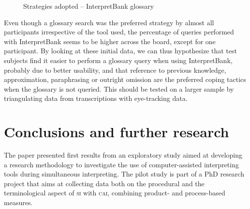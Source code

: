 \documentclass[output=paper]{langsci/langscibook}
\begin{document}
\begin{figure}
\caption{Strategies adopted -- InterpretBank glossary} 
\label{fig:prandi:17}
\end{figure}

Even though a glossary search was the preferred strategy by almost all participants irrespective of the tool used, the percentage of queries performed with InterpretBank seems to be higher across the board, except for one participant. By looking at these initial data, we can thus hypothesize that test subjects find it easier to perform a glossary query when using InterpretBank, probably due to better usability, and that reference to previous knowledge, approximation, paraphrasing or outright omission are the preferred coping tactics when the glossary is not queried. This should be tested on a larger sample by triangulating data from transcriptions with eye-tracking data. 

\section{Conclusions and further research}\label{sec:prandi:6}
The paper presented first results from an exploratory study aimed at developing a research methodology to investigate the use of computer-assisted interpreting tools during simultaneous interpreting. The pilot study is part of a PhD research project that aims at collecting data both on the procedural and the terminological aspect of \textsc{si} with \textsc{cai}, combining product- and process-based measures. 
\end{document}
